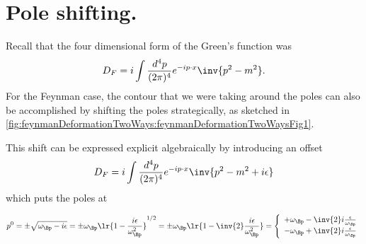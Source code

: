 %
%
\section{Pole shifting.}

Recall that the four dimensional form of the Green's function was
\begin{dmath}\label{eqn:qftLecture13:400}
D_F = i \int \frac{d^4 p}{(2 \pi)^4} e^{-i p \cdot x} \inv{ p^2 - m^2 }.
\end{dmath}
For the Feynman case, the contour that we were taking around the poles can also be accomplished by shifting the poles strategically, as sketched in \cref{fig:feynmanDeformationTwoWays:feynmanDeformationTwoWaysFig1}.


This shift can be expressed explicit algebraically by introducing an offset
\begin{dmath}\label{eqn:qftLecture13:420}
D_F = i \int \frac{d^4 p}{(2 \pi)^4} e^{-i p \cdot x} \inv{ p^2 - m^2 + i \epsilon }
\end{dmath}
which puts the poles at

\begin{dmath}\label{eqn:qftLecture13:440}
p^0
= \pm \sqrt{ \omega_\Bp - i \epsilon }
= \pm \omega_\Bp \lr{ 1 - \frac{i \epsilon}{\omega_\Bp^2} }^{1/2}
= \pm \omega_\Bp \lr{ 1 - \inv{2} \frac{i \epsilon}{\omega_\Bp^2} }
=
\left\{
\begin{array}{l}
+\omega_\Bp - \inv{2} i \frac{\epsilon}{\omega_\Bp} \\
-\omega_\Bp + \inv{2} i \frac{\epsilon}{\omega_\Bp} \\
\end{array}
\right.
\end{dmath}

